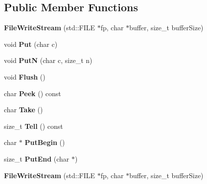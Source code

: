 \subsection*{Public Member Functions}
\begin{DoxyCompactItemize}
\item 
\mbox{\label{classFileWriteStream_a553ea3e7377a7f7cace2daa3cc90e1a1}} 
{\bfseries File\+Write\+Stream} (std\+::\+F\+I\+LE $\ast$fp, char $\ast$buffer, size\+\_\+t buffer\+Size)
\item 
\mbox{\label{classFileWriteStream_af6a6061d0accd939fa475b9b34427d85}} 
void {\bfseries Put} (char c)
\item 
\mbox{\label{classFileWriteStream_ad9ec108b24316a2c1c83c6ddc75d308a}} 
void {\bfseries PutN} (char c, size\+\_\+t n)
\item 
\mbox{\label{classFileWriteStream_a939fbf183ba36464c5e0837df4329d37}} 
void {\bfseries Flush} ()
\item 
\mbox{\label{classFileWriteStream_ab556c7e26346ddff0e579a53c09c3a13}} 
char {\bfseries Peek} () const
\item 
\mbox{\label{classFileWriteStream_ac927a0ae09a85eaba58a74ceb04b40ed}} 
char {\bfseries Take} ()
\item 
\mbox{\label{classFileWriteStream_a06272de32d6ac4d10c9bd5deb79a0234}} 
size\+\_\+t {\bfseries Tell} () const
\item 
\mbox{\label{classFileWriteStream_a4d1340a64fde3f16ac2afce19537c75e}} 
char $\ast$ {\bfseries Put\+Begin} ()
\item 
\mbox{\label{classFileWriteStream_a54b14047e4c998db0594290605f8f0dc}} 
size\+\_\+t {\bfseries Put\+End} (char $\ast$)
\item 
\mbox{\label{classFileWriteStream_a553ea3e7377a7f7cace2daa3cc90e1a1}} 
{\bfseries File\+Write\+Stream} (std\+::\+F\+I\+LE $\ast$fp, char $\ast$buffer, size\+\_\+t buffer\+Size)

\end{DoxyCompactItemize}
